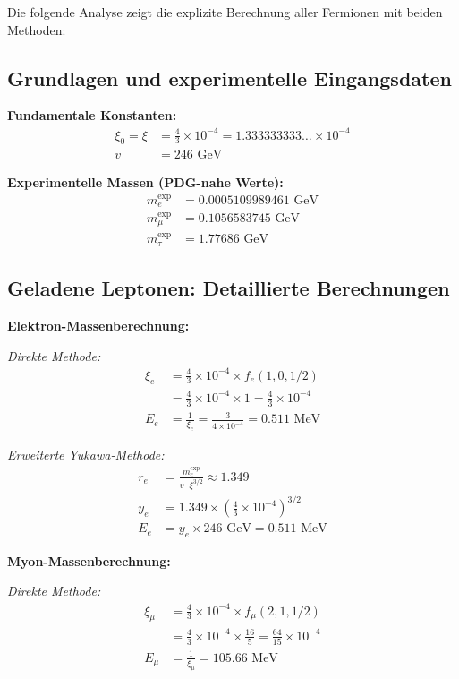 Die folgende Analyse zeigt die explizite Berechnung aller Fermionen mit beiden Methoden:

\subsection{Grundlagen und experimentelle Eingangsdaten}
\label{subsec:foundations}

\textbf{Fundamentale Konstanten:}
\begin{align}
	\xi_0 = \xi &= \frac{4}{3} \times 10^{-4} = 1.333333333\ldots \times 10^{-4} \\
	v &= 246 \text{ GeV}
\end{align}

\textbf{Experimentelle Massen (PDG-nahe Werte):}
\begin{align}
	m_e^{\text{exp}} &= 0.0005109989461 \text{ GeV} \\
	m_\mu^{\text{exp}} &= 0.1056583745 \text{ GeV} \\
	m_\tau^{\text{exp}} &= 1.77686 \text{ GeV}
\end{align}

\subsection{Geladene Leptonen: Detaillierte Berechnungen}
\label{subsec:charged_leptons_detailed}

\textbf{Elektron-Massenberechnung:}

\textit{Direkte Methode:}
\begin{align}
	\xi_e &= \frac{4}{3} \times 10^{-4} \times f_e(1,0,1/2) \\
	&= \frac{4}{3} \times 10^{-4} \times 1 = \frac{4}{3} \times 10^{-4} \\
	E_{e} &= \frac{1}{\xi_e} = \frac{3}{4 \times 10^{-4}} = 0.511 \text{ MeV}
\end{align}

\textit{Erweiterte Yukawa-Methode:}
\begin{align}
	r_e &= \frac{m_e^{\text{exp}}}{v \cdot \xi^{3/2}} \approx 1.349 \\
	y_e &= 1.349 \times \left(\frac{4}{3} \times 10^{-4}\right)^{3/2} \\
	E_e &= y_e \times 246 \text{ GeV} = 0.511 \text{ MeV}
\end{align}

\textbf{Myon-Massenberechnung:}

\textit{Direkte Methode:}
\begin{align}
	\xi_\mu &= \frac{4}{3} \times 10^{-4} \times f_\mu(2,1,1/2) \\
	&= \frac{4}{3} \times 10^{-4} \times \frac{16}{5} = \frac{64}{15} \times 10^{-4} \\
	E_{\mu} &= \frac{1}{\xi_\mu} = 105.66 \text{ MeV}
\end{align}

